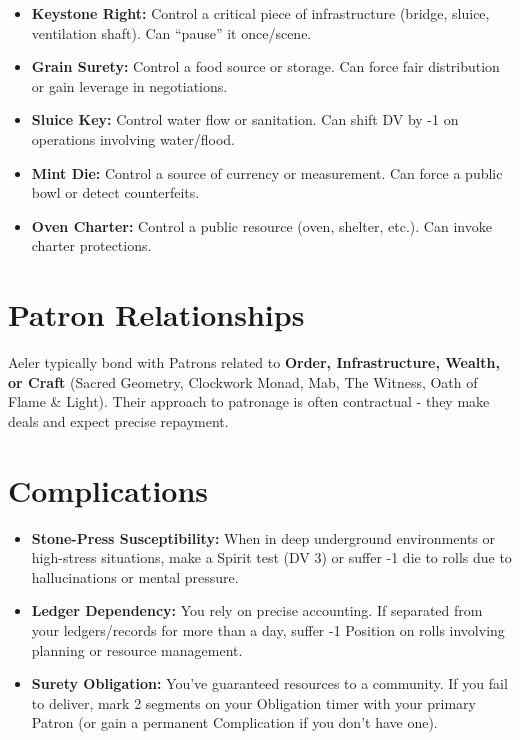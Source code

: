 \documentclass[11pt]{article}
\newcommand{\stringtype}[1]{\textbf{#1}}
\newcommand{\complicationtype}[1]{\textbf{#1}}
\begin{document}
\begin{itemize}
  \item \stringtype{Keystone Right:} Control a critical piece of infrastructure (bridge, sluice, ventilation shaft). Can ``pause'' it once/scene.
  \item \stringtype{Grain Surety:} Control a food source or storage. Can force fair distribution or gain leverage in negotiations.
  \item \stringtype{Sluice Key:} Control water flow or sanitation. Can shift DV by -1 on operations involving water/flood.
  \item \stringtype{Mint Die:} Control a source of currency or measurement. Can force a public bowl or detect counterfeits.
  \item \stringtype{Oven Charter:} Control a public resource (oven, shelter, etc.). Can invoke charter protections.
\end{itemize}

\section*{Patron Relationships}
Aeler typically bond with Patrons related to \textbf{Order, Infrastructure, Wealth, or Craft} (Sacred Geometry, Clockwork Monad, Mab, The Witness, Oath of Flame \& Light). Their approach to patronage is often contractual - they make deals and expect precise repayment.

\section*{Complications}
\begin{itemize}
  \item \complicationtype{Stone-Press Susceptibility:} When in deep underground environments or high-stress situations, make a Spirit test (DV 3) or suffer -1 die to rolls due to hallucinations or mental pressure.
  \item \complicationtype{Ledger Dependency:} You rely on precise accounting. If separated from your ledgers/records for more than a day, suffer -1 Position on rolls involving planning or resource management.
  \item \complicationtype{Surety Obligation:} You've guaranteed resources to a community. If you fail to deliver, mark 2 segments on your Obligation timer with your primary Patron (or gain a permanent Complication if you don't have one).
\end{itemize}
\end{document}
